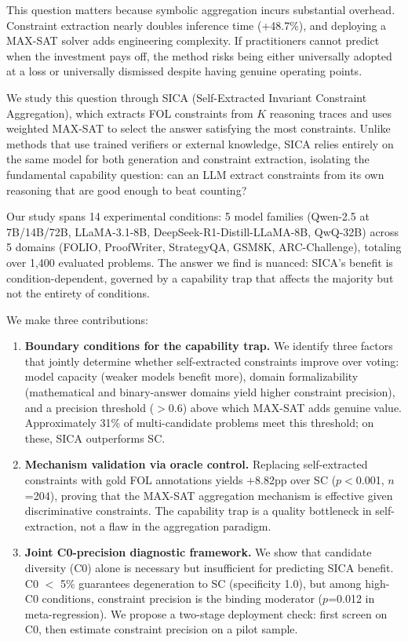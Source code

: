 \documentclass[11pt,a4paper]{article}
\begin{document}
This question matters because symbolic aggregation incurs substantial overhead. Constraint extraction nearly doubles inference time (+48.7\%), and deploying a MAX-SAT solver adds engineering complexity. If practitioners cannot predict when the investment pays off, the method risks being either universally adopted at a loss or universally dismissed despite having genuine operating points.

We study this question through SICA (Self-Extracted Invariant Constraint Aggregation), which extracts FOL constraints from $K$ reasoning traces and uses weighted MAX-SAT to select the answer satisfying the most constraints. Unlike methods that use trained verifiers or external knowledge, SICA relies entirely on the same model for both generation and constraint extraction, isolating the fundamental capability question: can an LLM extract constraints from its own reasoning that are good enough to beat counting?

Our study spans 14 experimental conditions: 5 model families (Qwen-2.5 at 7B/14B/72B, LLaMA-3.1-8B, DeepSeek-R1-Distill-LLaMA-8B, QwQ-32B) across 5 domains (FOLIO, ProofWriter, StrategyQA, GSM8K, ARC-Challenge), totaling over 1,400 evaluated problems. The answer we find is nuanced: SICA's benefit is condition-dependent, governed by a capability trap that affects the majority but not the entirety of conditions.

We make three contributions:
\begin{enumerate}
    \item \textbf{Boundary conditions for the capability trap.} We identify three factors that jointly determine whether self-extracted constraints improve over voting: model capacity (weaker models benefit more), domain formalizability (mathematical and binary-answer domains yield higher constraint precision), and a precision threshold ($>$0.6) above which MAX-SAT adds genuine value. Approximately 31\% of multi-candidate problems meet this threshold; on these, SICA outperforms SC.
    \item \textbf{Mechanism validation via oracle control.} Replacing self-extracted constraints with gold FOL annotations yields +8.82pp over SC ($p<$0.001, $n$=204), proving that the MAX-SAT aggregation mechanism is effective given discriminative constraints. The capability trap is a quality bottleneck in self-extraction, not a flaw in the aggregation paradigm.
    \item \textbf{Joint C0-precision diagnostic framework.} We show that candidate diversity (C0) alone is necessary but insufficient for predicting SICA benefit. C0 $<$ 5\% guarantees degeneration to SC (specificity 1.0), but among high-C0 conditions, constraint precision is the binding moderator ($p$=0.012 in meta-regression). We propose a two-stage deployment check: first screen on C0, then estimate constraint precision on a pilot sample.
\end{enumerate}
\end{document}
